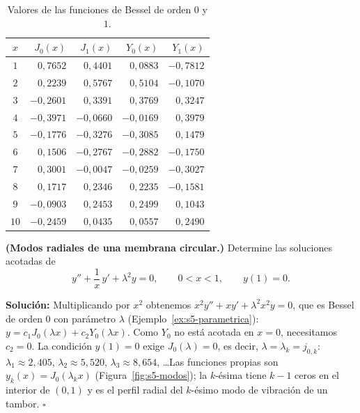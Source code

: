 \begin{table}[H]
\centering
\small
\caption{Valores de las funciones de Bessel de orden $0$ y $1$.}
\label{tab:s5-valores}
\begin{tabular}{|c|r|r|r|r|}
\hline
\rowcolor{bbe!15}$x$ & $J_0(x)$ & $J_1(x)$ & $Y_0(x)$ & $Y_1(x)$ \\ \hline
$1$ & $0{,}7652$ & $0{,}4401$ & $0{,}0883$ & $-0{,}7812$ \\ \hline
$2$ & $0{,}2239$ & $0{,}5767$ & $0{,}5104$ & $-0{,}1070$ \\ \hline
$3$ & $-0{,}2601$ & $0{,}3391$ & $0{,}3769$ & $0{,}3247$ \\ \hline
$4$ & $-0{,}3971$ & $-0{,}0660$ & $-0{,}0169$ & $0{,}3979$ \\ \hline
$5$ & $-0{,}1776$ & $-0{,}3276$ & $-0{,}3085$ & $0{,}1479$ \\ \hline
$6$ & $0{,}1506$ & $-0{,}2767$ & $-0{,}2882$ & $-0{,}1750$ \\ \hline
$7$ & $0{,}3001$ & $-0{,}0047$ & $-0{,}0259$ & $-0{,}3027$ \\ \hline
$8$ & $0{,}1717$ & $0{,}2346$ & $0{,}2235$ & $-0{,}1581$ \\ \hline
$9$ & $-0{,}0903$ & $0{,}2453$ & $0{,}2499$ & $0{,}1043$ \\ \hline
$10$ & $-0{,}2459$ & $0{,}0435$ & $0{,}0557$ & $0{,}2490$ \\ \hline
\end{tabular}
\end{table}
 
\begin{example}\label{ex:s5-tambor}
\textbf{(Modos radiales de una membrana circular.)} Determine las soluciones acotadas de
\[ y''+\frac1x\,y'+\lambda^2y=0,\qquad 0<x<1,\qquad y(1)=0. \]
 
\noindent \textbf{Solución:} \quad Multiplicando por $x^2$ obtenemos $x^2y''+xy'+\lambda^2x^2y=0$, que es Bessel de orden $0$ con parámetro $\lambda$ (Ejemplo~\ref{ex:s5-parametrica}): $y=c_1J_0(\lambda x)+c_2Y_0(\lambda x)$. Como $Y_0$ no está acotada en $x=0$, necesitamos $c_2=0$. La condición $y(1)=0$ exige $J_0(\lambda)=0$, es decir, $\lambda=\lambda_k=j_{0,k}$: $\lambda_1\approx2{,}405$, $\lambda_2\approx5{,}520$, $\lambda_3\approx8{,}654$, \dots Las funciones propias son $y_k(x)=J_0(\lambda_kx)$ (Figura~\ref{fig:s5-modos}); la $k$-ésima tiene $k-1$ ceros en el interior de $(0,1)$ y es el perfil radial del $k$-ésimo modo de vibración de un tambor. \hfill $\square$
\end{example}
 

